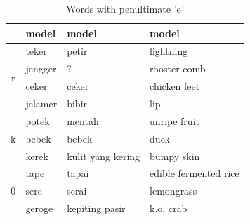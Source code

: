 \documentclass[12pt]{ouparticle}
\begin{document}
\begin{table}[]
\begin{tabular}{c|l l l}
                       & model & model   & model \\
    \hline 
    \multirow{4}{*}{r} & teker & petir & lightning\\
                       & jengger & ? & rooster comb\\
                       & ceker & ceker & chicken feet\\
                       & jelamer & bibir   & lip \\
    \hline
    \multirow{3}{*}{k} & potek & mentah & unripe fruit\\
                       & bebek & bebek & duck\\
                       & kerek & kulit yang kering & bumpy skin\\
    \hline
    \multirow{3}{*}{0} & tape & tapai & edible fermented rice\\
                       & sere & serai & lemongrass\\
                       & geroge & kepiting pasir & k.o. crab\\
    \end{tabular}
    \caption{Words with penultimate 'e'}
    \label{tab:my_label}
\end{table}
\end{document}
